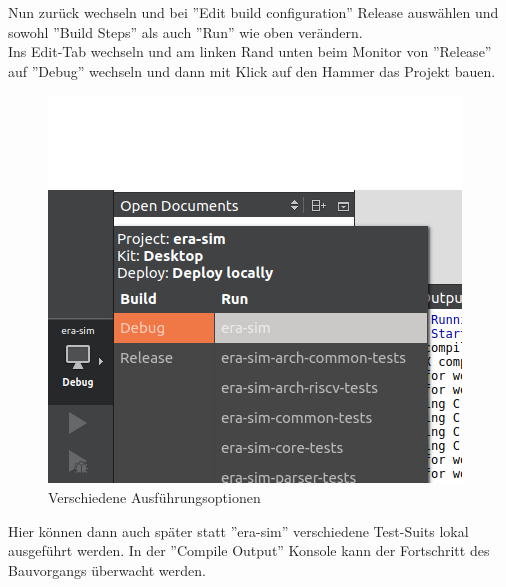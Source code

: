 Nun zurück wechseln und bei ''Edit build configuration'' Release auswählen und
sowohl ''Build Steps'' als auch ''Run'' wie oben verändern.\\

Ins Edit-Tab wechseln und am linken Rand unten beim Monitor von ''Release'' auf
''Debug'' wechseln und dann mit Klick auf den Hammer das Projekt bauen.\\
\begin{figure}[H]
	\centering
	\includegraphics[scale=0.7]{images/setup-qtcreator-change-buildrun-flavor.png}
	\caption{Verschiedene Ausführungsoptionen}
\end{figure}
Hier können dann auch später statt ''era-sim'' verschiedene Test-Suits lokal
ausgeführt werden. In der ''Compile Output'' Konsole kann der Fortschritt des
Bauvorgangs überwacht werden.\\


